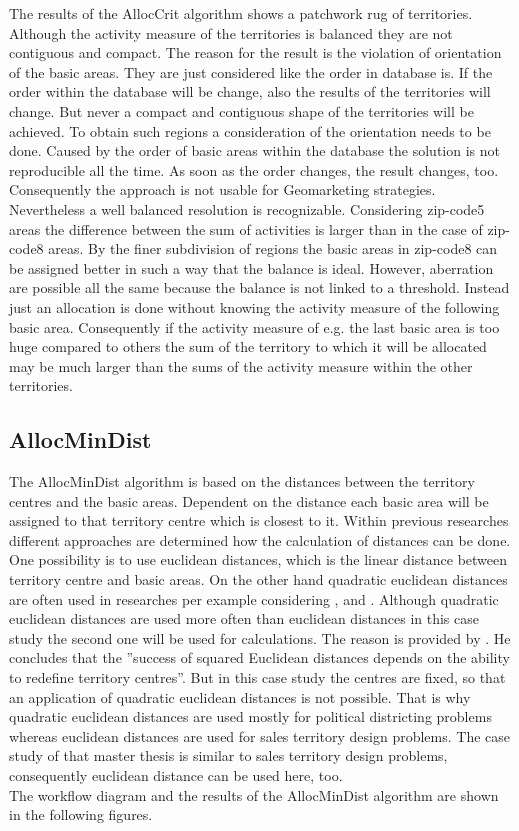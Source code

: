 The results of the AllocCrit algorithm shows a patchwork rug of territories. Although the activity measure of the territories is balanced they are not contiguous and compact. The reason for the result is the violation of orientation of the basic areas. They are just considered like the order in database is. If the order within the database will be change, also the results of the territories will change. But never a compact and contiguous shape of the territories will be achieved. To obtain such regions a consideration of the orientation needs to be done. Caused by the order of basic areas within the database the solution is not reproducible all the time. As soon as the order changes, the result changes, too. Consequently the approach is not usable for Geomarketing strategies. Nevertheless a well balanced resolution is recognizable. Considering zip-code5 areas the difference between the sum of activities is larger than in the case of zip-code8 areas. By the finer subdivision of regions the basic areas in zip-code8 can be assigned better in such a way that the balance is ideal. However, aberration are possible all the same because the balance is not linked to a threshold. Instead just an allocation is done without knowing the activity measure of the following basic area. Consequently if the activity measure of e.g. the last basic area is too huge compared to others the sum of the territory to which it will be allocated may be much larger than the sums of the activity measure within the other territories.

\subsection{AllocMinDist}

The AllocMinDist algorithm is based on the distances between the territory centres and the basic areas. Dependent on the distance each basic area will be assigned to that territory centre which is closest to it. Within previous researches different approaches are determined how the calculation of distances can be done. One possibility is to use euclidean distances, which is the linear distance between territory centre and basic areas. On the other hand quadratic euclidean distances are often used in researches per example considering \citeauthor{fleischmann} \cite{fleischmann}, \citeauthor{george} \cite{george} and \citeauthor{hess} \cite{hess}. Although quadratic euclidean distances are used more often than euclidean distances in this case study the second one will be used for calculations. The reason is provided by \citeauthor{marlin}. He concludes that the ''success of squared Euclidean distances depends on the ability to redefine territory centres''\cite{marlin}. But in this case study the centres are fixed, so that an application of quadratic euclidean distances is not possible. That is why quadratic euclidean distances are used mostly for political districting problems whereas euclidean distances are used for sales territory design problems. The case study of that master thesis is similar to sales territory design problems, consequently euclidean distance can be used here, too. \\
The workflow diagram and the results of the AllocMinDist algorithm are shown in the following figures.

